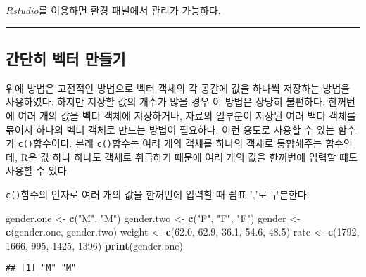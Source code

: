 \documentclass[
]{article}
\newenvironment{Shaded}{\begin{snugshade}}{\end{snugshade}}
\newcommand{\DecValTok}[1]{\textcolor[rgb]{0.00,0.00,0.81}{#1}}
\newcommand{\FloatTok}[1]{\textcolor[rgb]{0.00,0.00,0.81}{#1}}
\newcommand{\FunctionTok}[1]{\textcolor[rgb]{0.13,0.29,0.53}{\textbf{#1}}}
\newcommand{\NormalTok}[1]{#1}
\newcommand{\OtherTok}[1]{\textcolor[rgb]{0.56,0.35,0.01}{#1}}
\newcommand{\StringTok}[1]{\textcolor[rgb]{0.31,0.60,0.02}{#1}}
\begin{document}
\emph{Rstudio}를 이용하면 환경 패널에서 관리가 가능하다.

\begin{center}\rule{0.5\linewidth}{0.5pt}\end{center}

\hypertarget{uxac04uxb2e8uxd788-uxbca1uxd130-uxb9ccuxb4e4uxae30}{%
\subsection{간단히 벡터
만들기}\label{uxac04uxb2e8uxd788-uxbca1uxd130-uxb9ccuxb4e4uxae30}}

위에 방법은 고전적인 방법으로 벡터 객체의 각 공간에 값을 하나씩 저장하는
방법을 사용하였다. 하지만 저장할 값의 개수가 많을 경우 이 방법은 상당히
불편하다. 한꺼번에 여러 개의 값을 벡터 객체에 저장하거나, 자료의
일부분이 저장된 여러 백터 객체를 묶어서 하나의 벡터 객체로 만드는 방법이
필요하다. 이런 용도로 사용할 수 있는 함수가 \texttt{c()}함수이다. 본래
\texttt{c()}함수는 여러 개의 객체를 하나의 객체로 통합해주는 함수인데,
R은 값 하나 하나도 객체로 취급하기 때문에 여러 개의 값을 한꺼번에 입력할
때도 사용할 수 있다.

\texttt{c()}함수의 인자로 여러 개의 값을 한꺼번에 입력할 때 쉼표 ','로
구분한다.

\begin{Shaded}
\begin{Highlighting}[]
\NormalTok{gender.one }\OtherTok{\textless{}{-}} \FunctionTok{c}\NormalTok{(}\StringTok{"M"}\NormalTok{, }\StringTok{"M"}\NormalTok{)}
\NormalTok{gender.two }\OtherTok{\textless{}{-}} \FunctionTok{c}\NormalTok{(}\StringTok{"F"}\NormalTok{, }\StringTok{"F"}\NormalTok{, }\StringTok{"F"}\NormalTok{)}
\NormalTok{gender }\OtherTok{\textless{}{-}} \FunctionTok{c}\NormalTok{(gender.one, gender.two)}
\NormalTok{weight }\OtherTok{\textless{}{-}} \FunctionTok{c}\NormalTok{(}\FloatTok{62.0}\NormalTok{, }\FloatTok{62.9}\NormalTok{, }\FloatTok{36.1}\NormalTok{, }\FloatTok{54.6}\NormalTok{, }\FloatTok{48.5}\NormalTok{)}
\NormalTok{rate }\OtherTok{\textless{}{-}} \FunctionTok{c}\NormalTok{(}\DecValTok{1792}\NormalTok{, }\DecValTok{1666}\NormalTok{, }\DecValTok{995}\NormalTok{, }\DecValTok{1425}\NormalTok{, }\DecValTok{1396}\NormalTok{)}
\FunctionTok{print}\NormalTok{(gender.one)}
\end{Highlighting}
\end{Shaded}

\begin{verbatim}
## [1] "M" "M"
\end{verbatim}
\end{document}
